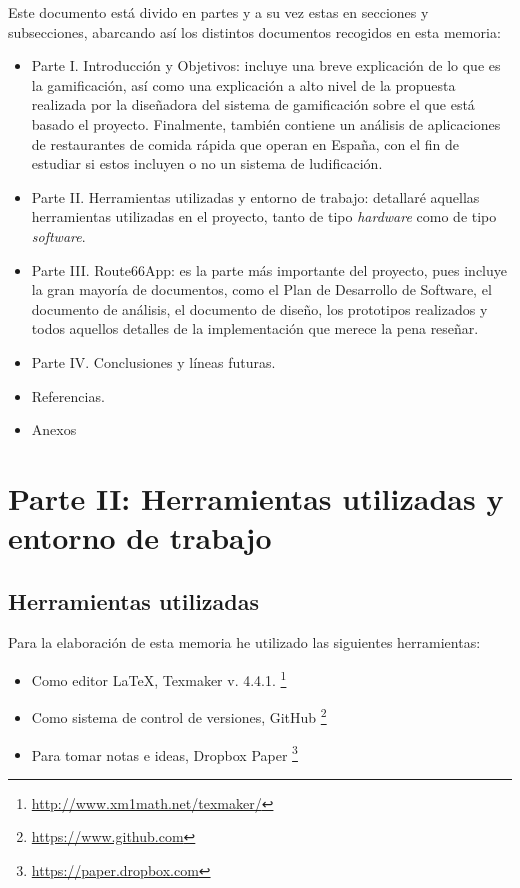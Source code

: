 \documentclass[twoside]{report}
\begin{document}
Este documento está divido en partes y a su vez estas en secciones y subsecciones, abarcando así los distintos documentos recogidos en esta memoria:

\begin{itemize}
\item Parte I. Introducción y Objetivos: incluye una breve explicación de lo que es la gamificación, así como una explicación a alto nivel de la propuesta realizada por la diseñadora del sistema de gamificación sobre el que está basado el proyecto. Finalmente, también contiene un análisis de aplicaciones de restaurantes de comida rápida que operan en España, con el fin de estudiar si estos incluyen o no un sistema de ludificación.

\item Parte II. Herramientas utilizadas y entorno de trabajo: detallaré aquellas herramientas utilizadas en el proyecto, tanto de tipo \textit{hardware} como de tipo \textit{software}. 

\item Parte III. Route66App: es la parte más importante del proyecto, pues incluye la gran mayoría de documentos, como el Plan de Desarrollo de Software, el documento de análisis, el documento de diseño, los prototipos realizados y todos aquellos detalles de la implementación que merece la pena reseñar.

\item Parte IV. Conclusiones y líneas futuras.

\item Referencias.

\item Anexos

\end{itemize}

\chapter{Parte II: Herramientas utilizadas y entorno de trabajo}
\section{Herramientas utilizadas}

Para la elaboración de esta memoria he utilizado las siguientes herramientas:
\begin{itemize}
\item Como editor \LaTeX , Texmaker v. 4.4.1. \footnote{\url{http://www.xm1math.net/texmaker/}}
\item Como sistema de control de versiones, GitHub \footnote{\url{https://www.github.com}}
\item Para tomar notas e ideas, Dropbox Paper \footnote{\url{https://paper.dropbox.com}}
\end{itemize}
\end{document}
